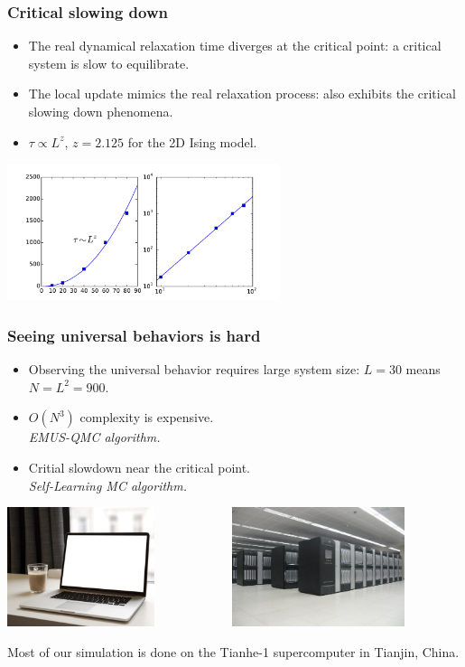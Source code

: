 \documentclass[xcolor=table, 10pt, aspectratio=43]{beamer}
\begin{document}
\begin{frame}
  \frametitle{Critical slowing down}
  \begin{itemize}
    \item The real dynamical relaxation time diverges at the critical point: a critical system is slow to equilibrate.
    \item The local update mimics the real relaxation process: also exhibits the critical slowing down phenomena.
    \item $\tau\propto L^z$, $z=2.125$ for the 2D Ising model.
  \end{itemize}
  \begin{center}
    \includegraphics[width=8cm]{slowdown}
  \end{center}
\end{frame}

\begin{frame}
  \frametitle{Seeing universal behaviors is hard}
  \begin{itemize}
    \item Observing the universal behavior requires large system size: $L=30$ means $N=L^2=900$.
    \item \alert{$O(N^3)$} complexity is expensive.\\
		\emph{EMUS-QMC algorithm.}
		\item Critial slowdown near the critical point.\\
		\emph{Self-Learning MC algorithm.}
  \end{itemize}
  \begin{center}
    \includegraphics[height=3.5cm]{laptop_coffee}
    ~~~~~~~~~~~
    \includegraphics[height=3.5cm]{tianhe}
  \end{center}
	Most of our simulation is done on the Tianhe-1 supercomputer in Tianjin, China.
\end{frame}
\end{document}
